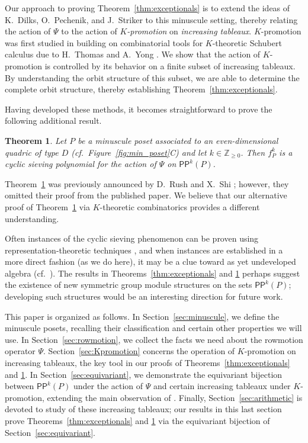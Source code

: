 \documentclass[12pt]{amsart}
\newtheorem{theorem}{Theorem}[section]
\theoremstyle{definition}
\theoremstyle{remark}
\numberwithin{equation}{section}
\newcommand{\pp}{\ensuremath{\mathsf{PP}}}
\begin{document}
Our approach to proving Theorem~\ref{thm:exceptionals} is to extend the ideas of K.~Dilks, O.~Pechenik, and J.~Striker \cite{DPS} to this minuscule setting, thereby relating the action of $\Psi$ to the action of \emph{$K$-promotion} on \emph{increasing tableaux}. $K$-promotion was first studied in \cite{Pechenik} building on combinatorial tools for $K$-theoretic Schubert calculus due to H.~Thomas and A.~Yong \cite{Thomas.Yong:K}. We show that the action of $K$-promotion is controlled by its behavior on a finite subset of increasing tableaux. By understanding the orbit structure of this subset, we are able to determine the complete orbit structure, thereby establishing Theorem~\ref{thm:exceptionals}.

Having developed these methods, it becomes straightforward to prove the following additional result.
\begin{theorem}\label{thm:propeller}
Let $P$ be a minuscule poset associated to an even-dimensional quadric of type $D$ (cf.~Figure~\ref{fig:min_poset}C) and let $k \in \mathbb{Z}_{\geq 0}$. Then $f_P^k$ is a cyclic sieving polynomial for the action of $\Psi$ on $\pp^k(P)$.
\end{theorem}
Theorem~\ref{thm:propeller} was previously announced by D.~Rush and X.~Shi \cite[Theorem~10.1]{Rush.Shi}; however, they omitted their proof \cite[]{Rush.Shi:report} from the published paper. We believe that our alternative proof of Theorem~\ref{thm:propeller} via $K$-theoretic combinatorics provides a different understanding.

Often instances of the cyclic sieving phenomenon can be proven using representation-theoretic techniques \cite{Reiner.Stanton.White, Rhoades:thesis}, and when instances are established in a more direct fashion (as we do here), it may be a clue toward as yet undeveloped algebra (cf.\ \cite{Rhoades:skein}). The results in Theorems~\ref{thm:exceptionals} and \ref{thm:propeller} perhaps suggest the existence of new symmetric group module structures on the sets $\pp^k(P)$; developing such structures would be an interesting direction for future work.

This paper is organized as follows. In Section~\ref{sec:minuscule}, we define the minuscule posets, recalling their classification and certain other properties we will use. In Section~\ref{sec:rowmotion}, we collect the facts we need about the rowmotion operator $\Psi$. Section~\ref{sec:Kpromotion} concerns the operation of $K$-promotion on increasing tableaux, the key tool in our proofs of Theorems~\ref{thm:exceptionals} and \ref{thm:propeller}. In Section~\ref{sec:equivariant}, we demonstrate the equivariant bijection between $\pp^k(P)$ under the action of $\Psi$ and certain increasing tableaux under $K$-promotion, extending the main observation of \cite{DPS}.
Finally, Section~\ref{sec:arithmetic} is devoted to study of these increasing tableaux; our results in this last section prove Theorems~\ref{thm:exceptionals} and \ref{thm:propeller} via the equivariant bijection of Section~\ref{sec:equivariant}.
\end{document}
